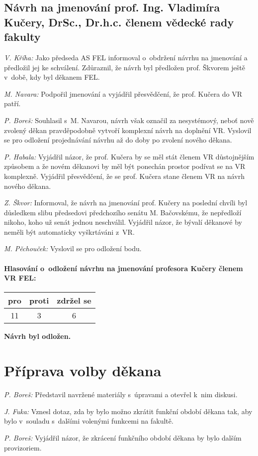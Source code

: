 \documentclass[a4paper,12pt,notitlepage,oneside]{article}
\newcommand{\hlasovani}[3]{\begin{center}
\begin{tabular}{|c|c|c|}\hline
pro& proti & zdržel se \\ \hline
#1 & #2 & #3 \\ \hline
\end{tabular}
\end{center}}
\begin{document}
\subsection{Návrh na jmenování prof. Ing. Vladimíra Kučery, DrSc., Dr.h.c. členem vědecké rady fakulty}
\textit{V. Kříha:} Jako předseda AS FEL informoval o~obdržení návrhu na jmenování a předložil jej ke schválení. Zdůraznil, že návrh byl předložen prof. Škvorem ještě v~době, kdy byl děkanem FEL.

\textit{M. Navara:} Podpořil jmenování a vyjádřil přesvědčení, že prof. Kučera do VR patří.

\textit{P. Boreš:} Souhlasil s~M. Navarou, návrh však označil za nesystémový, neboť nově zvolený děkan pravděpodobně vytvoří komplexní návrh na doplnění VR. Vyslovil se pro odložení projednávání návrhu až do doby po zvolení nového děkana.

\textit{P. Habala:} Vyjádřil názor, že prof. Kučera by se měl stát členem VR  důstojnějším způsobem a že novém děkanovi by měl být ponechán prostor podívat se na VR komplexně. Vyjádřil přesvědčení, že se prof. Kučera stane členem VR na návrh nového děkana.

\textit{Z. Škvor:} Informoval, že návrh na jmenování prof. Kučery na poslední chvíli byl důsledkem slibu předsedovi předchozího senátu M. Bačovskému, že nepředloží nikoho, koho už senát jednou neschválil. Vyjádřil názor, že bývalí děkanové by neměli být automaticky vyškrtáváni z~VR.

\textit{M. Pěchouček:} Vyslovil se pro odložení bodu.

\paragraph{Hlasování o~odložení návrhu na jmenování profesora Kučery členem VR FEL:}
\hlasovani{11}{3}{6}
\textbf{Návrh byl odložen.}


\section{Příprava volby děkana}

\textit{P. Boreš:} Představil navržené materiály s~úpravami a otevřel k~nim diskusi.

\textit{J. Fuka:} Vznesl dotaz, zda by bylo možno zkrátit funkční období děkana tak, aby bylo v~souladu s~dalšími volenými funkcemi na fakultě.

\textit{P. Boreš:} Vyjádřil názor, že zkrácení funkčního období děkana by bylo dalším provizoriem.
\end{document}

